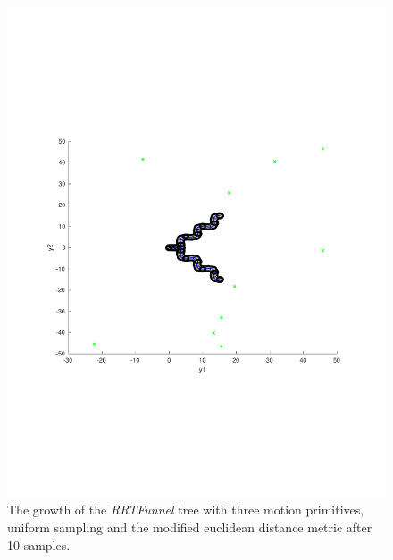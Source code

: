 \begin{figure}
  \includegraphics[scale=.5]{figures/rrtfunnel/rrtfunnel-modified-euclidean-10samples}
  \caption{The growth of the \textit{RRTFunnel} tree with three motion
    primitives, uniform sampling and the modified euclidean distance metric
    after 10 samples.}
\end{figure}

